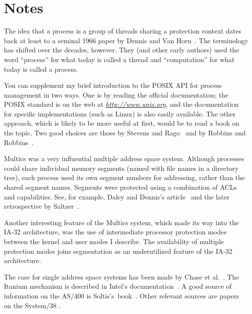 \section*{Notes}
The idea that a process is a group of threads sharing a protection
context dates back at least to a seminal 1966 paper by Dennis and Van
Horn~\cite{max1090}.  The terminology has shifted over the decades,
however.  They (and other early authors) used the word ``process'' for
what today is called a thread and ``computation'' for what today is called a
process.

You can supplement my brief introduction to the POSIX API for process
management in two ways.  One is by reading the official documentation;
the POSIX standard is on the web at \textit{\url{http://www.unix.org}}, and the
documentation for specific implementations (such as Linux) is also
easily available.  The other approach, which is likely to be more
useful at first, would be to read a book on the topic.  Two good choices
are those by Stevens and Rago~\cite{max1101} and by
Robbins and
Robbins~\cite{max1102}.

Multics was a very influential multiple address space system.
Although processes could share individual memory segments (named with
file names in a directory tree), each process used its own segment
numbers for addressing, rather than the shared segment names.
Segments were protected using a combination of ACLs and capabilities.
See, for example, Daley and Dennis's article~\cite{max1036} and the later retrospective
by Saltzer~\cite{max1045}.

Another interesting feature of the Multics system, which made its way
into the IA-32 architecture, was the use of intermediate processor
protection modes between the kernel and user modes I describe.  The
availability of multiple protection modes joins segmentation as an
underutilized feature of the IA-32 architecture.

The case for single address space systems has been made by
Chase et al.~\cite{max1039}.  The
Itanium mechanism is described in Intel's
documentation~\cite{max1064}.  A good source of information on the
AS/400 is Soltis's~book~\cite{max1091}.  Other relevant sources are papers on
the System/38 \cite{max1082,max1079,max1078}.

